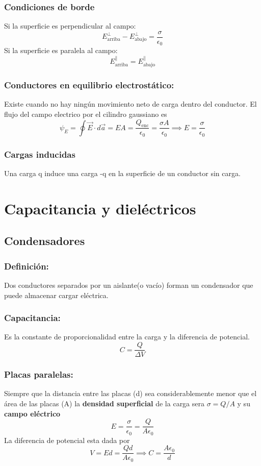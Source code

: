 \documentclass[a4paper, 10pt]{article}
\begin{document}
\begin{multicols*}{2}
	\subsubsection{Condiciones de borde}
	Si la superficie es perpendicular al campo:
	$$E_{\text{arriba}}^{\perp} - E _{\text{abajo}}^{\perp}=\frac{\sigma}{\epsilon_0}$$
	Si la superficie es paralela al campo:
	$$E_{\text{arriba}}^{\parallel}=E_{\text{abajo}}^{\parallel}$$
	    
	\subsubsection{Conductores en equilibrio electrostático:} Existe cuando no hay ningún movimiento neto de carga dentro del conductor.
	El flujo del campo electrico por el cilindro gaussiano es 
	$$\psi _E = \oint\vec{E}\cdot d\vec{a}=EA=\frac{Q_{\text{enc}}}{\epsilon_0}=\frac{\sigma A}{\epsilon_0} \implies E=\frac{\sigma}{\epsilon_0}$$
	    
	\subsubsection{Cargas inducidas}
	Una carga q induce una carga -q en la superficie de un conductor sin carga.
	    
	    
	    
	\section{Capacitancia y dieléctricos}
	\subsection{Condensadores}
	\subsubsection{Definición:} Dos conductores separados por un aislante(o vacío) forman un condensador que puede almacenar cargar eléctrica.
	    
	\subsubsection{Capacitancia:} Es la constante de proporcionalidad entre la carga y la diferencia de potencial. $$C = \frac{Q}{\Delta V}$$
	    
	\subsubsection{Placas paralelas:} Siempre que la distancia entre las placas (d) sea considerablemente menor que el área de las placas (A)
  la \textbf{densidad superficial} de la carga sera 
  $\sigma = Q/A $ y su \textbf{campo eléctrico} 
  $$E = \frac{\sigma}{\epsilon_0} = \frac{Q}{A \epsilon_0}$$
	La diferencia de potencial esta dada por 
  $$ V = Ed = \frac{Qd}{A\epsilon_0} \implies C = \frac{A\epsilon_0}{d}$$ 
	    

\end{multicols*}
\end{document}
